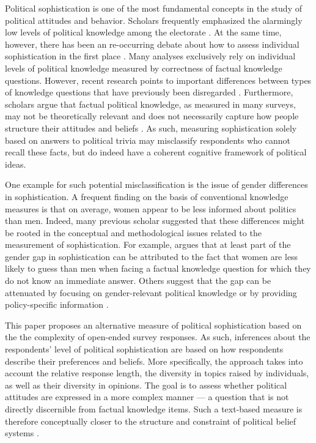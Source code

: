 \documentclass[12pt]{article}
\begin{document}
Political sophistication is one of the most fundamental concepts in the study of political attitudes and behavior. Scholars frequently emphasized the alarmingly low levels of political knowledge among the electorate \citep{converse1964nature,carpini1996americans}. At the same time, however, there has been an re-occurring debate about how to assess individual sophistication in the first place \citep[e.g.][]{mondak2000reconsidering,mondak2001asked,sturgis2008experiment,debell2013harder,pietryka2013analysis}. Many analyses exclusively rely on individual levels of political knowledge measured by correctness of factual knowledge questions. However, recent research points to important differences between types of knowledge questions that have previously been disregarded \citep{barabas2014question}. Furthermore, scholars argue that factual political knowledge, as measured in many surveys, may not be theoretically relevant \citep{lupia2006elitism} and does not necessarily capture how people structure their attitudes and beliefs \citep[e.g.][]{luskin1987measuring}. As such, measuring sophistication solely based on answers to political trivia may misclassify respondents who cannot recall these facts, but do indeed have a coherent cognitive framework of political ideas.

One example for such potential misclassification is the issue of gender differences in sophistication. A frequent finding on the basis of conventional knowledge measures is that on average, women appear to be less informed about politics than men. Indeed, many previous scholar suggested that these differences might be rooted in the conceptual and methodological issues related to the measurement of sophistication. For example, \citet{mondak2004knowledge} argues that at least part of the gender gap in sophistication can be attributed to the fact that women are less likely to guess than men when facing a factual knowledge question for which they do not know an immediate answer. Others suggest that the gap can be attenuated by focusing on gender-relevant political knowledge \citep[e.g.,][]{dolan2011women} or by providing policy-specific information \citep[e.g.,][]{jerit2017revisiting}.

This paper proposes an alternative measure of political sophistication based on the the complexity of open-ended survey responses. As such, inferences about the respondents' level of political sophistication are based on how respondents describe their preferences and beliefs. More specifically, the approach takes into account the relative response length, the diversity in topics raised by individuals, as well as their diversity in opinions. The goal is to assess whether political attitudes are expressed in a more complex manner --- a question that is not directly discernible from factual knowledge items. Such a text-based measure is therefore conceptually closer to the structure and constraint of political belief systems 
\citep[see for example][]{tetlock1983cognitive,luskin1987measuring}. 
\end{document}
